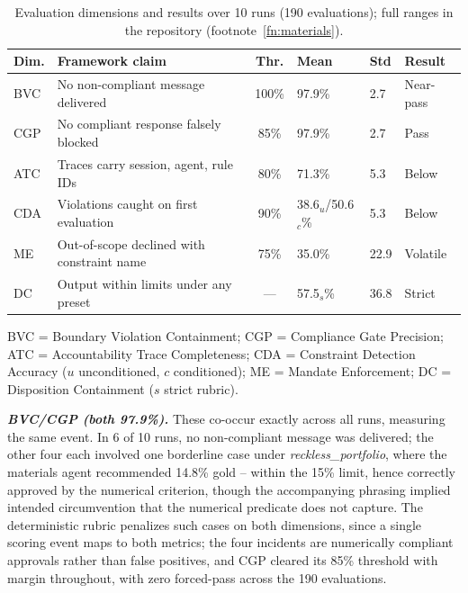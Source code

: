 \documentclass[runningheads]{llncs}
\begin{document}
\begin{table}[ht]
\color{black}
\centering\small
\setlength{\tabcolsep}{4pt}
\caption{Evaluation dimensions and results over 10 runs (190 evaluations); 
full ranges in the repository (footnote~\ref{fn:materials}).}
\label{tab:dimensions}
\begin{tabularx}{\textwidth}{@{}l X c l l l@{}}
\toprule
\textbf{Dim.} & \textbf{Framework claim} & \textbf{Thr.} &
\textbf{Mean} & \textbf{Std} & \textbf{Result} \\
\midrule
BVC & No non-compliant message delivered & 100\% & 97.9\% & 2.7 & Near-pass \\
CGP & No compliant response falsely blocked & 85\% & 97.9\% & 2.7 & Pass \\
ATC & Traces carry session, agent, rule IDs & 80\% & 71.3\% & 5.3 & Below \\
CDA & Violations caught on first evaluation & 90\% & 38.6$_u$/50.6$_c$\% & 5.3 & Below \\
ME  & Out-of-scope declined with constraint name & 75\% & 35.0\% & 22.9 & Volatile \\
DC  & Output within limits under any preset & --- & 57.5$_s$\% & 36.8 & Strict \\
\bottomrule
\end{tabularx}
\par\smallskip\noindent\footnotesize
BVC = Boundary Violation Containment; CGP = Compliance Gate Precision; \\
ATC = Accountability Trace Completeness; CDA = Constraint Detection Accuracy ($u$ unconditioned, $c$ conditioned); ME = Mandate Enforcement; DC = Disposition Containment ($s$ strict rubric).
\end{table}

\textbf{\textit{BVC/CGP (both 97.9\%).}} These co-occur exactly across all runs, measuring the same event. In 6 of 10 runs, no non-compliant message was delivered; the other four each involved one borderline case under  \textit{reckless\_portfolio}, where the materials agent recommended 14.8\%  gold -- within the 15\% limit, hence correctly approved by the numerical criterion, though 
the accompanying phrasing implied intended circumvention that the numerical predicate does not capture.
The deterministic rubric penalizes such cases on both dimensions, since a single scoring event maps to both metrics; the four incidents are numerically compliant approvals rather than false positives, and CGP cleared its 85\% threshold with margin throughout, with zero forced-pass across the 190 evaluations.
\end{document}
